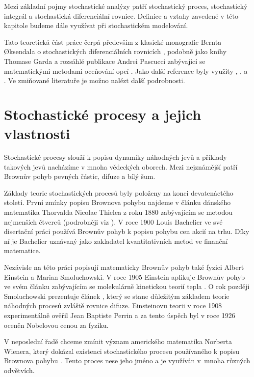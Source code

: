 \documentclass[a4paper,12pt]{report}
\theoremstyle{definition} \newtheorem{definice}[veta]{Definice}
\theoremstyle{remark}
\begin{document}
Mezi základní pojmy stochastické analýzy patří stochastický proces, stochastický integrál a stochastická diferenciální rovnice.
Definice a vztahy zavedené v této kapitole budeme dále využívat při stochastickém modelování.

Tato teoretická část práce čerpá především z klasické monografie Bernta {\O}ksendala o stochastických diferenciálních rovnicích \cite{oksendal2003stochastic}, 
podobně jako knihy Thomase Garda  \cite{gard} 
a rozsáhlé publikace Andrei Pascucci zabývající se matematickými metodami oceňování opcí \cite{pascucci}.
Jako další reference byly využity \cite{karatzas2012brownian}, \cite{allen2010introduction},  \cite{shreve2012stochastic} a \cite{shreve2004stochastic}.
Ve zmiňované literatuře je možno nalézt další podrobnosti.

\section{Stochastické procesy a jejich vlastnosti}
Stochastické procesy slouží k popisu dynamiky náhodných jevů a příklady takových jevů nacházíme v mnoha vědeckých oborech.
Mezi nejznámější patří Brownův pohyb pevných částic, difuze a bílý šum.

Základy teorie stochastických procesů byly položeny na konci devatenáctého století.
První zmínky popisu Brownova pohybu najdeme v článku dánského matematika Thorvalda Nicolae Thielea z roku 1880 zabývajícím se metodou nejmenších čtverců (podrobněji viz \cite{lauritzen2002thiele}). %
V roce 1900 Louis Bachelier ve své disertační práci \cite{bachelier} používá Brownův pohyb k popisu pohybu cen akcií na trhu.
Díky ní je Bachelier uznávaný jako zakladatel kvantitativních metod ve finanční matematice.

Nezávisle na této práci popisují matematicky Brownův pohyb také fyzici Albert Einstein a Marian Smoluchowski. 
V roce 1905 Einstein aplikuje Brownův pohyb ve svém článku zabývajícím se molekulárně kinetickou teorií tepla \cite{einstein}.
O rok později Smoluchowski prezentuje článek \cite{Smoluchowski}, který se stane důležitým základem teorie náhodných procesů zvláště rovnice difuze.
Einsteinovu teorii v roce 1908 experimentálně ověřil Jean Baptiste Perrin \cite{perrin2013brownian} a za tento úspěch byl v roce 1926 oceněn Nobelovou cenou za fyziku. 

V neposlední řadě chceme zmínit význam amerického matematika Norberta Wienera, který dokázal existenci stochastického procesu používaného k popisu Brownova pohybu \cite{wiener1923differential}. 
Tento proces nese jeho jméno a je využíván v~mnoha různých odvětvích.
\end{document}
